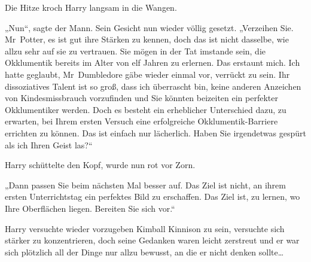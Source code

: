 Die Hitze kroch Harry langsam in die Wangen.

„Nun“, sagte der Mann. Sein Gesicht nun wieder völlig gesetzt. „Verzeihen Sie. Mr~Potter, es ist gut ihre Stärken zu kennen, doch das ist nicht dasselbe, wie allzu sehr auf sie zu vertrauen. Sie mögen in der Tat imstande sein, die Okklumentik bereits im Alter von elf Jahren zu erlernen. Das erstaunt mich. Ich hatte geglaubt, Mr~Dumbledore gäbe wieder einmal vor, verrückt zu sein. Ihr dissoziatives Talent ist so groß, dass ich überrascht bin, keine anderen Anzeichen von Kindesmissbrauch vorzufinden und Sie könnten beizeiten ein perfekter Okklumentiker werden. Doch es besteht ein erheblicher Unterschied dazu, zu erwarten, bei Ihrem ersten Versuch eine erfolgreiche Okklumentik-Barriere errichten zu können. Das ist einfach nur lächerlich. Haben Sie irgendetwas gespürt als ich Ihren Geist las?“

Harry schüttelte den Kopf, wurde nun rot vor Zorn.

„Dann passen Sie beim nächsten Mal besser auf. Das Ziel ist nicht, an ihrem ersten Unterrichtstag ein perfektes Bild zu erschaffen. Das Ziel ist, zu lernen, wo Ihre Oberflächen liegen. Bereiten Sie sich vor.“

Harry versuchte wieder vorzugeben Kimball Kinnison zu sein, versuchte sich stärker zu konzentrieren, doch seine Gedanken waren leicht zerstreut und er war sich plötzlich all der Dinge nur allzu bewusst, an die er nicht denken sollte…

